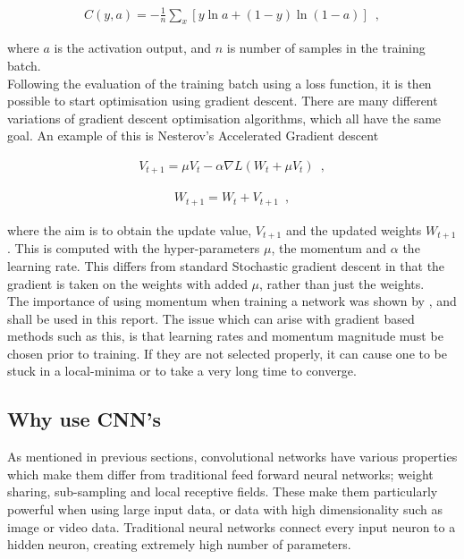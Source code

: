 \documentclass[11pt,a4paper]{memoir}
\numberwithin{figure}{section}
\numberwithin{table}{section}
\numberwithin{equation}{section}
\begin{document}
\begin{eqnarray} 
  C(y, a) = -\frac{1}{n} \sum_x \left[y \ln a + (1-y ) \ln (1-a) \right] 
  \label{eq:cross}\enspace,
\end{eqnarray}

where $a$ is the activation output, and $n$ is number of samples in the training batch. \\

Following the evaluation of the training batch using a loss function, it is then possible to start optimisation using gradient descent. There are many different variations of gradient descent optimisation algorithms, which all have the same goal. An example of this is \cite{nesterov1983method} Nesterov's Accelerated Gradient descent 

\begin{eqnarray}
V_{t+1} = \mu V_t - \alpha \nabla L(W_t + \mu V_t) \enspace,
\label{eq_nest}
\end{eqnarray}

\begin{eqnarray}
W_{t+1} = W_t + V_{t+1} \enspace,
\label{update}
\end{eqnarray}

where the aim is to obtain the update value, $V_{t+1}$ and the updated weights $W_{t+1}$. This is computed with the hyper-parameters $\mu$, the momentum and $\alpha$ the learning rate. This differs from standard Stochastic gradient descent in that the gradient is taken on the weights with added $\mu$, rather than just the weights. \\

The importance of using momentum when training a network was shown by \cite{SutskeverOnLearning}, and shall be used in this report. The issue which can arise with gradient based methods such as this, is that learning rates and momentum magnitude must be chosen prior to training. If they are not selected properly, it can cause one to be stuck in a local-minima or to take a very long time to converge. \\

\subsection{Why use CNN's}
As mentioned in previous sections, convolutional networks have various properties which make them differ from traditional feed forward neural networks; weight sharing, sub-sampling and local receptive fields. These make them particularly powerful when using large input data, or data with high dimensionality such as image or video data. Traditional neural networks connect every input neuron to a hidden neuron, creating extremely high number of parameters.\\
\end{document}
